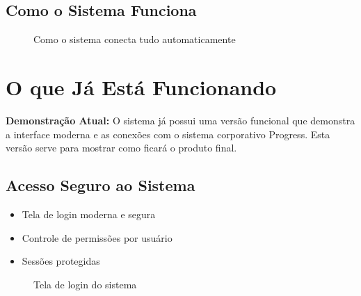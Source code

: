 \documentclass[12pt,a4paper]{article}
\begin{document}
\subsection{Como o Sistema Funciona}
\begin{figure}[H]
    \centering
    \caption{Como o sistema conecta tudo automaticamente}
\end{figure}

\section{O que Já Está Funcionando}

\textbf{Demonstração Atual:} O sistema já possui uma versão funcional que demonstra a interface moderna e as conexões com o sistema corporativo Progress. Esta versão serve para mostrar como ficará o produto final.

\subsection{Acesso Seguro ao Sistema}
\begin{itemize}
    \item Tela de login moderna e segura
    \item Controle de permissões por usuário
    \item Sessões protegidas
\end{itemize}

\begin{figure}[H]
    \centering
    \fbox{\begin{minipage}{12cm}
        \centering
        \vspace{4cm}
        {\large [SCREENSHOT - Tela de Login]}
        \vspace{4cm}
    \end{minipage}}
    \caption{Tela de login do sistema}
\end{figure}
\end{document}
